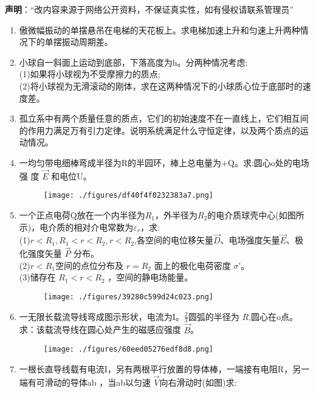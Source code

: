 
\textbf{声明}：“改内容来源于网络公开资料，不保证真实性，如有侵权请联系管理员”


\begin{enumerate}
\item 傲微幅振动的单摆悬吊在电梯的天花板上。求电梯加速上升和匀速上升两种情况下的单摆振动周期差。
\item 小球自一斜面上运动到底部，下落高度为h。分两种情况考虑:\\
(1)如果将小球视为不受摩擦力的质点;\\
(2)将小球视为无滑滚动的刚体，求在这两种情况下的小球质心位于底部时的速度差。
\item 孤立系中有两个质量任意的质点，它们的初始速度不在一直线上，它们相互间的作用力满足万有引力定律。说明系统满足什么守恒定律，以及两个质点的运动情况。
\item 一均匀带电细棒弯成半径为R的半园环，棒上总电量为+Q。求:圆心o处的电场强
度 $\vec{E}$ 和电位U。\begin{figure}[ht]
\centering
\texttt{[image: ./figures/df40f4f0232383a7.png]}
\caption{} \label{fig_SSD103_1}
\end{figure}
\item 一个正点电荷Q放在一个内半径为$R_1$，外半径为$R_2$的电介质球壳中心(如图所示)，电介质的相对介电常数为$\varepsilon_r$，求:\\
(1)$r<R_1,R_1<r<R_2,r<R_2$,各空间的电位移矢量$\vec D$、电场强度矢量$\vec{E}$、极化强度矢量 $\vec P$ 分布。\\
(2)$r<R_1$空间的点位分布及 $r=R_2$ 面上的极化电荷密度 $\sigma$'。\\
(3)储存在 $R_1<r<R_2$ ，空间的静电场能量。
\begin{figure}[ht]
\centering
\texttt{[image: ./figures/39280c599d24c023.png]}
\caption{} \label{fig_SSD103_2}
\end{figure}
\item 一无限长载流导线弯成图示形状，电流为I。$\frac{2}{3}$圆弧的半径为 $R$,圆心在o点。求：该载流导线在圆心处产生的磁感应强度 $\vec B$。
\begin{figure}[ht]
\centering
\texttt{[image: ./figures/60eed05276edf8d8.png]}
\caption{} \label{fig_SSD103_3}
\end{figure}
\item 一根长直导线载有电流I，另有两根平行放置的导体棒，一端接有电阻R，另一端有可滑动的导体ab ，当ab以匀速 $\vec V$向右滑动时(如图)求:\\

\end{enumerate}
